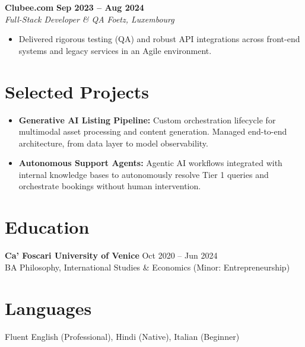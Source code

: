 \documentclass[a4paper,10pt]{article}
\newcommand{\role}[4]{%
 \textbf{#1} \hfill \textbf{#2}\\[1pt]%
 \textit{#3} \hfill \textit{#4}\\[2pt]%
}
\begin{document}
\role{Clubee.com}{Sep 2023 -- Aug 2024}{Full-Stack Developer \& QA}{Foetz, Luxembourg}
\begin{itemize}
 \item Delivered rigorous testing (QA) and robust API integrations across front-end systems and legacy services in an Agile environment.
\end{itemize}

\section{Selected Projects}
\begin{itemize}
 \item \textbf{Generative AI Listing Pipeline:} Custom orchestration lifecycle for multimodal asset processing and content generation. Managed end-to-end architecture, from data layer to model observability.
 \item \textbf{Autonomous Support Agents:} Agentic AI workflows integrated with internal knowledge bases to autonomously resolve Tier 1 queries and orchestrate bookings without human intervention.
\end{itemize}

\section{Education}
\textbf{Ca' Foscari University of Venice} \hfill Oct 2020 -- Jun 2024\\
BA Philosophy, International Studies \& Economics (Minor: Entrepreneurship)

\section{Languages}
Fluent English (Professional), Hindi (Native), Italian (Beginner)
\end{document}
